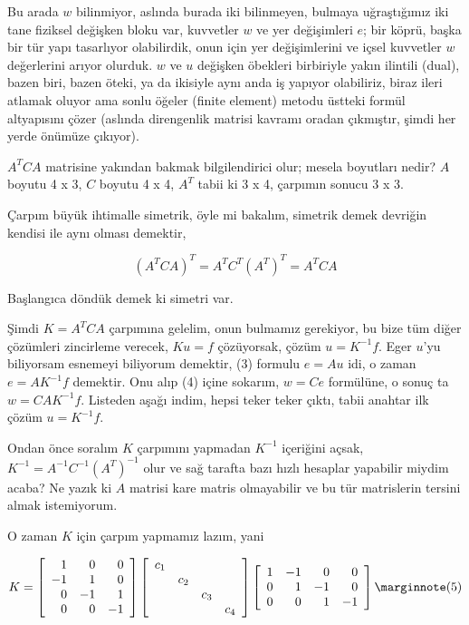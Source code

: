 \documentclass[12pt,fleqn]{article}\usepackage{../../common}
\begin{document}
Bu arada $w$ bilinmiyor, aslında burada iki bilinmeyen, bulmaya uğraştığımız iki
tane fiziksel değişken bloku var, kuvvetler $w$ ve yer değişimleri $e$; bir
köprü, başka bir tür yapı tasarlıyor olabilirdik, onun için yer değişimlerini ve
içsel kuvvetler $w$ değerlerini arıyor olurduk. $w$ ve $u$ değişken öbekleri
birbiriyle yakın ilintili (dual), bazen biri, bazen öteki, ya da ikisiyle aynı
anda iş yapıyor olabiliriz, biraz ileri atlamak oluyor ama sonlu öğeler (finite
element) metodu üstteki formül altyapısını çözer (aslında direngenlik matrisi
kavramı oradan çıkmıştır, şimdi her yerde önümüze çıkıyor).

$A^T C A$ matrisine yakından bakmak bilgilendirici olur; mesela boyutları nedir?
$A$ boyutu 4 x 3, $C$ boyutu 4 x 4, $A^T$ tabii ki 3 x 4, çarpımın sonucu 3 x 3.

Çarpım büyük ihtimalle simetrik, öyle mi bakalım, simetrik demek devriğin
kendisi ile aynı olması demektir, 

$$
(A^T C A)^T = A^T C^T (A^T)^T = A^T C A 
$$

Başlangıca döndük demek ki simetri var.

Şimdi $K = A^T C A$ çarpımına gelelim, onun bulmamız gerekiyor, bu bize tüm
diğer çözümleri zincirleme verecek, $K u = f$ çözüyorsak, çözüm $u = K^{-1}f$.
Eger $u$'yu biliyorsam esnemeyi biliyorum demektir, (3) formulu $e = A u$
idi, o zaman $e = A K^{-1} f$ demektir. Onu alıp (4) içine sokarım, $w = C e$
formülüne, o sonuç ta $w = C A K^{-1} f$. Listeden aşağı indim, hepsi teker
teker çıktı, tabii anahtar ilk çözüm $u = K^{-1} f$.

Ondan önce soralım $K$ çarpımını yapmadan $K^{-1}$ içeriğini açsak,
$K^{-1} = A^{-1}C^{-1} (A^T)^{-1}$ olur ve sağ tarafta bazı hızlı hesaplar
yapabilir miydim acaba? Ne yazık ki $A$ matrisi kare matris olmayabilir ve
bu tür matrislerin tersini almak istemiyorum. 

O zaman $K$ için çarpım yapmamız lazım, yani

$$
K = \left[\begin{array}{rrrr}
1 & 0 & 0 \\ -1 & 1 & 0 \\ 0 & -1 & 1 \\ 0 & 0 & -1
\end{array}\right]
\left[\begin{array}{cccc}
c_1 & & & \\  & c_2 & & \\  & & c_3 & \\ & & & c_4
\end{array}\right]
\left[\begin{array}{rrrr}
1 & -1 & 0 & 0 \\ 0 & 1 & -1 & 0 \\ 0 & 0 & 1 & -1 
\end{array}\right]
\mlabel{5}
$$
\end{document}
